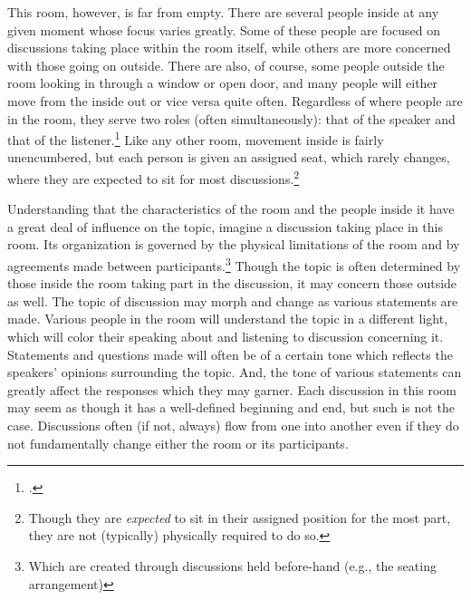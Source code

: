 \documentclass{article}
\begin{document}
This room, however, is far from empty. There are several people inside at any given moment whose focus varies greatly.
Some of these people are focused on discussions taking place within the room itself, while others are more concerned with those going on outside.
There are also, of course, some people outside the room looking in through a window or open door, and many people will either move from the inside out or vice versa quite often.
Regardless of where people are in the room, they serve two roles (often simultaneously): that of the speaker and that of the listener.\footcite[4]{bickford96}
Like any other room, movement inside is fairly unencumbered, but each person is given an assigned seat, which rarely changes, where they are expected to sit for most discussions.\footnote{Though they are \emph{expected} to sit in their assigned position for the most part, they are not (typically) physically required to do so.}

Understanding that the characteristics of the room and the people inside it have a great deal of influence on the topic, imagine a discussion taking place in this room.
Its organization is governed by the physical limitations of the room and by agreements made between participants.\footnote{Which are created through discussions held before-hand (e.g., the seating arrangement)}
Though the topic is often determined by those inside the room taking part in the discussion, it may concern those outside as well.
The topic of discussion may morph and change as various statements are made.
Various people in the room will understand the topic in a different light, which will color their speaking about and listening to discussion concerning it.
Statements and questions made will often be of a certain tone which reflects the speakers' opinions surrounding the topic.
And, the tone of various statements can greatly affect the responses which they may garner.
Each discussion in this room may seem as though it has a well-defined beginning and end, but such is not the case.
Discussions often (if not, always) flow from one into another even if they do not fundamentally change either the room or its participants.
\end{document}
